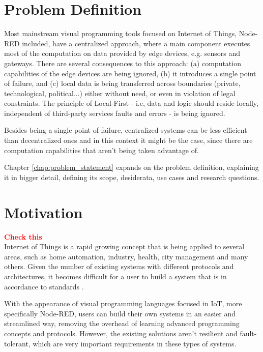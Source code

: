 \section{Problem Definition} \label{sec:problem_definition}

Most mainstream visual programming tools focused on Internet of Things, Node-RED included, have a centralized approach, where a main component executes most of the computation on data provided by edge devices, e.g. sensors and gateways. There are several consequences to this approach: (a) computation capabilities of the edge devices are being ignored, (b) it introduces a single point of failure, and (c) local data is being transferred across boundaries (private, technological, political...) either without need, or even in violation of legal constraints. The principle of Local-First - i.e, data and logic should reside locally, independent of third-party services faults and errors - is being ignored. 
\par Besides being a single point of failure, centralized systems can be less efficient than decentralized ones and in this context it might be the case, since there are computation capabilities that aren't being taken advantage of.
\par Chapter \ref{chap:problem_statement} expands on the problem definition, explaining it in bigger detail, defining its scope, desiderata, use cases and research questions.

\section{Motivation} \label{sec:motivation}

\textcolor{red}{\textbf{Check this}}\\
Internet of Things is a rapid growing concept that is being applied to several areas, such as home automation, industry, health, city management and many others. Given the number of existing systems with different protocols and architectures, it becomes difficult for a user to build a system that is in accordance to standards \cite{standard-iot}. 
\par With the appearance of visual programming languages focused in IoT, more specifically Node-RED, users can build their own systems in an easier and streamlined way, removing the overhead of learning advanced programming concepts and protocols. However, the existing solutions aren't resilient and fault-tolerant, which are very important requirements in these types of systems.

